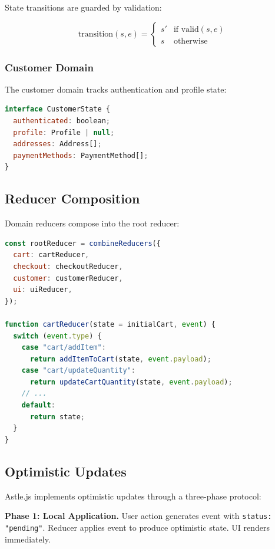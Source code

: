 \documentclass[11pt,twocolumn]{article}
\begin{document}
State transitions are guarded by validation:

\begin{equation}
\text{transition}(s, e) = \begin{cases}
s' & \text{if valid}(s, e) \\
s & \text{otherwise}
\end{cases}
\end{equation}

\subsubsection{Customer Domain}

The customer domain tracks authentication and profile state:

\begin{lstlisting}[language=JavaScript,caption=Customer state]
interface CustomerState {
  authenticated: boolean;
  profile: Profile | null;
  addresses: Address[];
  paymentMethods: PaymentMethod[];
}
\end{lstlisting}

\subsection{Reducer Composition}

Domain reducers compose into the root reducer:

\begin{lstlisting}[language=JavaScript,caption=Root reducer composition]
const rootReducer = combineReducers({
  cart: cartReducer,
  checkout: checkoutReducer,
  customer: customerReducer,
  ui: uiReducer,
});

function cartReducer(state = initialCart, event) {
  switch (event.type) {
    case "cart/addItem":
      return addItemToCart(state, event.payload);
    case "cart/updateQuantity":
      return updateCartQuantity(state, event.payload);
    // ...
    default:
      return state;
  }
}
\end{lstlisting}

\subsection{Optimistic Updates}

Astle.js implements optimistic updates through a three-phase protocol:

\textbf{Phase 1: Local Application.} User action generates event with \texttt{status: "pending"}. Reducer applies event to produce optimistic state. UI renders immediately.
\end{document}
